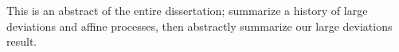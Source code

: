 This is an abstract of the entire dissertation; summarize a history of large deviations and affine processes, then abstractly summarize our large deviations result.
